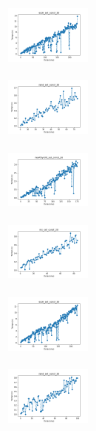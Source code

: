 \begin{figure}[H]
\begin{subfigure}
        \centering
        \includegraphics[width=0.234\textwidth]{img/bl/ecoli_set_const_20_589741062_time.png}
    \end{subfigure}
    \hfill
    \begin{subfigure}
        \centering
        \includegraphics[width=0.234\textwidth]{img/bl/rand_set_const_20_589741062_time.png}
    \end{subfigure}
    \hfill
    \begin{subfigure}
        \centering
        \includegraphics[width=0.234\textwidth]{img/bl/newthyroid_set_const_20_589741062_time.png}
    \end{subfigure}
    \hfill
    \begin{subfigure}
        \centering
        \includegraphics[width=0.234\textwidth]{img/bl/iris_set_const_20_277451237_time.png}
    \end{subfigure}
    \hfill
    \begin{subfigure}
        \centering
        \includegraphics[width=0.234\textwidth]{img/bl/ecoli_set_const_20_277451237_time.png}
    \end{subfigure}
    \hfill
    \begin{subfigure}
        \centering
        \includegraphics[width=0.234\textwidth]{img/bl/rand_set_const_20_277451237_time.png}

\end{subfigure}
\end{figure}
